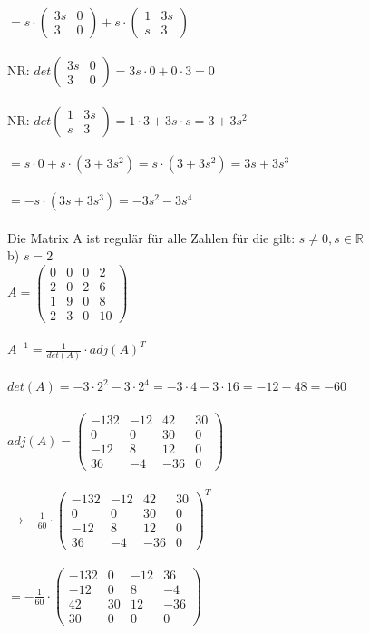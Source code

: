 \documentclass[12pt,a4paper]{article}
\begin{document}
\\
\indent $=s\cdot\begin{pmatrix} 3s&0\\3&0 \end{pmatrix}+s\cdot \begin{pmatrix} 1&3s\\s&3 \end{pmatrix}$\\
\\
\indent \indent NR: $det\begin{pmatrix} 3s&0\\3&0 \end{pmatrix}=3s\cdot 0+0\cdot 3 =0$\\
\\
\indent \indent NR: $det\begin{pmatrix} 1&3s\\s&3 \end{pmatrix}=1\cdot 3+3s\cdot s =3+3s^2$\\
\\
\indent $=s\cdot 0+s\cdot (3+3s^2) = s\cdot(3+3s^2)=3s+3s^3$\\
\\
$=-s\cdot(3s+3s^3) = -3s^2-3s^4$\\
\\
Die Matrix A ist regulär für alle Zahlen für die gilt: $s \ne 0, s \in \mathbb{R}$
\\
b) $s=2$\\
$A=\begin{pmatrix} 0&0&0&2\\2&0&2&6\\1&9&0&8\\2&3&0&10 \end{pmatrix}$\\
\\
$A^{-1}=\frac{1}{det(A)}\cdot adj(A)^T$\\
\\
$det(A)=-3\cdot 2^2-3\cdot 2^4=-3\cdot 4-3\cdot 16=-12-48=-60$\\
\\
$adj(A)=\begin{pmatrix} -132&-12&42&30 \\ 0&0&30&0\\-12&8&12&0\\36&-4&-36&0  \end{pmatrix}$\\
\\
$\rightarrow -\frac{1}{60}\cdot \begin{pmatrix} -132&-12&42&30 \\ 0&0&30&0\\-12&8&12&0\\36&-4&-36&0  \end{pmatrix}^T$\\
\\
$=-\frac{1}{60}\cdot \begin{pmatrix} -132&0&-12&36 \\ -12&0&8&-4\\42&30&12&-36\\30&0&0&0  \end{pmatrix}$\\
\\
\end{document}

